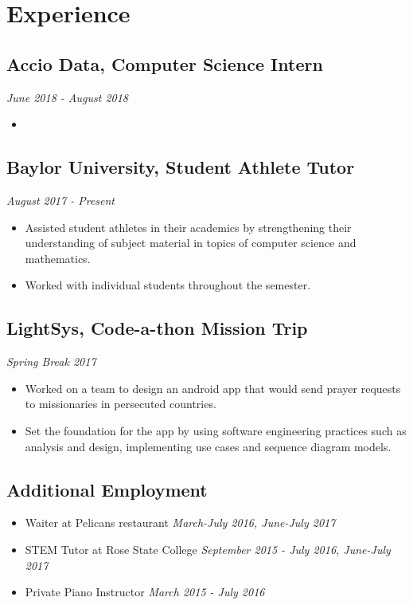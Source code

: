 \documentclass{article}
\begin{document}
\section{Experience}

\subsection{Accio Data, Computer Science Intern}
\hfill\textit{June 2018 - August 2018}

\begin{itemize}
	\item 
\end{itemize}

\subsection{Baylor University, Student Athlete Tutor} 
\hfill\textit{August 2017 - Present}

\begin{itemize}
	\item Assisted student athletes in their academics by strengthening their understanding of subject material in topics of computer science and mathematics.
	
	\item Worked with individual students throughout the semester. 
\end{itemize}

\subsection{LightSys, Code-a-thon Mission Trip}
\hfill
\textit{Spring Break 2017}

\begin{itemize}
	\item Worked on a team to design an android app that would send prayer requests
	to missionaries in persecuted countries. 

	\item Set the foundation for the app by using software engineering practices such as analysis and design, implementing use cases and sequence diagram models.
\end{itemize}
  
\subsection{Additional Employment}
\begin{itemize}
	\item Waiter at Pelicans restaurant \hfill\textit{March-July 2016, June-July 2017} 
	
	\item STEM Tutor at Rose State College \hfill\textit{September 2015 - July 2016, June-July 2017} 
	
	\item Private Piano Instructor \hfill\textit{March 2015 - July 2016}
\end{itemize}
\end{document}
